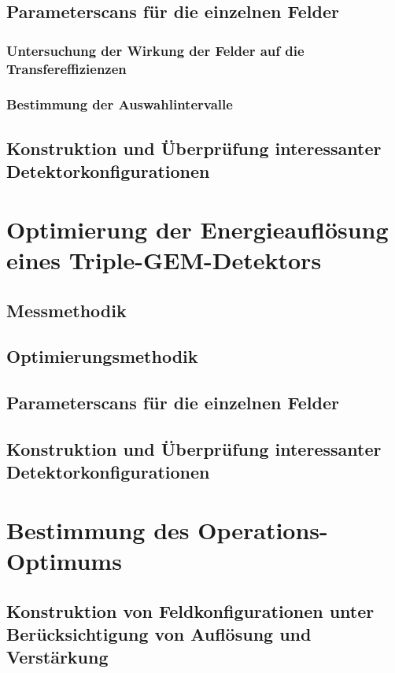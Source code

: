 	
	
	
	\newpage
	\section{Parameterscans für die einzelnen Felder}
		\subsection{Untersuchung der Wirkung der Felder auf die Transfereffizienzen}
		
		\subsection{Bestimmung der Auswahlintervalle}
	
	
	\newpage
	\section{Konstruktion und Überprüfung interessanter Detektorkonfigurationen}


\newpage
\chapter{Optimierung der Energieauflösung eines Triple-GEM-Detektors}
	\section{Messmethodik}
	
	\section{Optimierungsmethodik}
	
	\section{Parameterscans für die einzelnen Felder}
	
	\section{Konstruktion und Überprüfung interessanter Detektorkonfigurationen}
	
	
\chapter{Bestimmung des Operations-Optimums}
	\section{Konstruktion von Feldkonfigurationen unter Berücksichtigung von Auflösung und Verstärkung}
	
